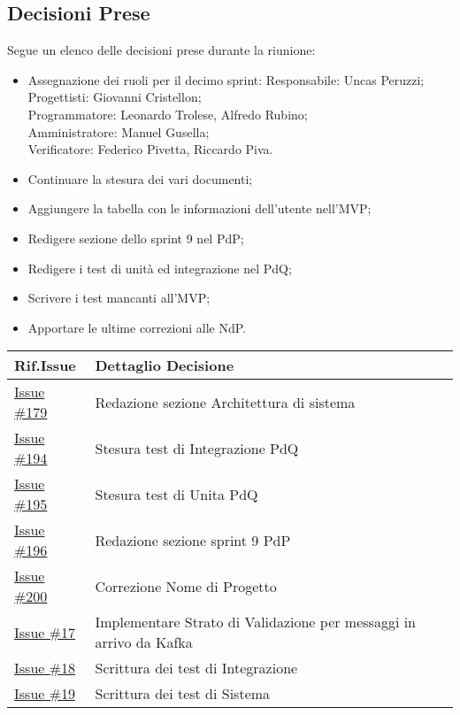 \documentclass[10pt]{article}
\begin{document}
\subsection{Decisioni Prese}
Segue un elenco delle decisioni prese durante la riunione:
\begin{itemize}
    \item   Assegnazione dei ruoli per il decimo sprint:
            Responsabile: Uncas Peruzzi;\\
            Progettisti: Giovanni Cristellon;\\
            Programmatore: Leonardo Trolese, Alfredo Rubino;\\
            Amministratore: Manuel Gusella;\\
            Verificatore: Federico Pivetta, Riccardo Piva.
    \item Continuare la stesura dei vari documenti;
    \item Aggiungere la tabella con le informazioni dell'utente nell'MVP;
    \item Redigere sezione dello sprint 9 nel PdP;
    \item Redigere i test di unità ed integrazione nel PdQ;
    \item Scrivere i test mancanti all'MVP;
    \item Apportare le ultime correzioni alle NdP.
\end{itemize}

\begin{center}
    \begin{tabular}{|>{\centering\arraybackslash}m{3cm}|>{\centering\arraybackslash}m{12cm}|}
	\hline
	\textbf{Rif.Issue} & \textbf{Dettaglio Decisione}\\
	\hline  
            \href{https://github.com/SevenBitsSwe/7BitsDocs/issues/179}{Issue \#179} & Redazione sezione Architettura di sistema\\
        \hline
            \href{https://github.com/SevenBitsSwe/7BitsDocs/issues/194}{Issue \#194} & Stesura test di Integrazione PdQ\\
        \hline
            \href{https://github.com/SevenBitsSwe/7BitsDocs/issues/195}{Issue \#195} & Stesura test di Unita PdQ\\
        \hline
            \href{https://github.com/SevenBitsSwe/7BitsDocs/issues/196}{Issue \#196} & Redazione sezione sprint 9 PdP\\
        \hline
            \href{https://github.com/SevenBitsSwe/7BitsDocs/issues/200}{Issue \#200} & Correzione Nome di Progetto\\
        \hline
            \href{https://github.com/SevenBitsSwe/MVP/issues/17}{Issue \#17} & Implementare Strato di Validazione per messaggi in arrivo da Kafka\\
        \hline
            \href{https://github.com/SevenBitsSwe/MVP/issues/18}{Issue \#18} & Scrittura dei test di Integrazione\\
        \hline
            \href{https://github.com/SevenBitsSwe/MVP/issues/19}{Issue \#19} & Scrittura dei test di Sistema\\
        \hline
    \end{tabular}
\end{center}
\end{document}
